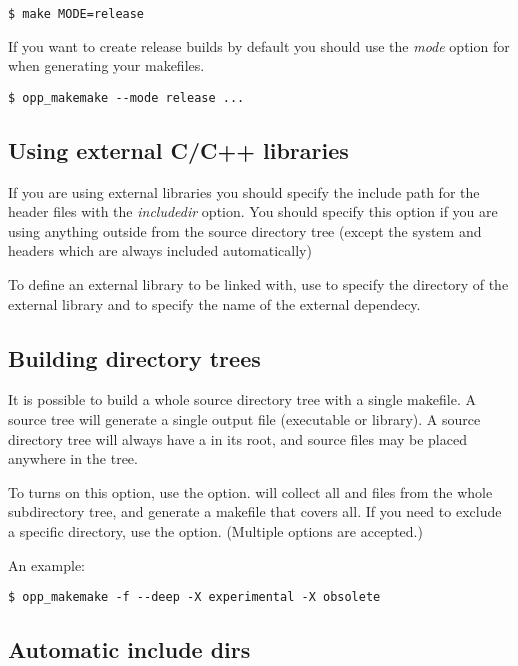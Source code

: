 \begin{verbatim}
$ make MODE=release
\end{verbatim}

If you want to create release builds by default you should use the  \textit{mode} 
option for  when generating your makefiles.
\begin{verbatim}
$ opp_makemake --mode release ...
\end{verbatim}


\subsection{Using external C/C++ libraries}

If you are using external libraries you should specify the include path for the header files
with the  \textit{includedir} option. You should specify this option if you are using
anything outside from the source directory tree (except the system and \opp headers which are
always included automatically)

To define an external library to be linked with, use  to specify
the directory of the external library and  to specify the name of the
external dependecy.


\subsection{Building directory trees}

It is possible to build a whole source directory tree with a single makefile.
A source tree will generate a single output file (executable or library).
A source directory tree will always have a  in its root,
and source files may be placed anywhere in the tree.

To turns on this option, use the  option.
 will collect all  and  files from
the whole subdirectory tree, and generate a makefile that covers all.
If you need to exclude a specific directory, use the 
option. (Multiple  options are accepted.)

An example:

\begin{verbatim}
$ opp_makemake -f --deep -X experimental -X obsolete
\end{verbatim}


\subsection{Automatic include dirs}

